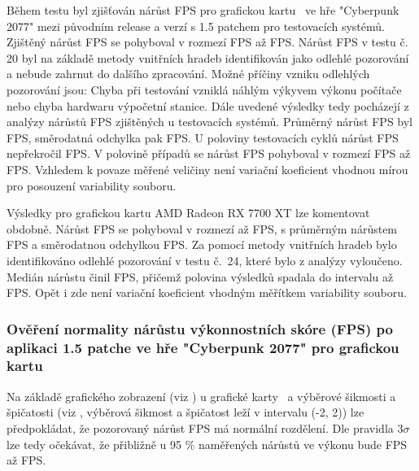 Během testu byl zjišťován nárůst FPS pro grafickou kartu \nvidiaCardTri\ ve hře "Cyberpunk 2077" mezi původním release a verzí s 1.5 patchem
pro  testovacích systémů. Zjištěný nárůst FPS se pohyboval v rozmezí  FPS
až  FPS. Nárůst FPS v testu č. 20 byl na základě metody vnitřních hradeb identifikován jako odlehlé pozorování
a nebude zahrnut do dalšího zpracování. Možné příčiny vzniku odlehlých pozorování jsou: Chyba při testování vzniklá náhlým výkyvem výkonu počítače
nebo chyba hardwaru výpočetní stanice. Dále uvedené výsledky tedy pocházejí z analýzy nárůstů FPS zjištěných u 
testovacích systémů. Průměrný nárůst FPS byl  FPS, směrodatná odchylka pak  FPS\@.
U poloviny testovacích cyklů nárůst FPS nepřekročil  FPS. V polovině případů se nárůst FPS pohyboval v
rozmezí  FPS až  FPS. Vzhledem k povaze měřené veličiny není variační koeficient vhodnou mírou
pro posouzení variability souboru.

\vspace{1em}
\noindent
Výsledky pro grafickou kartu AMD Radeon RX 7700 XT lze komentovat obdobně.
Nárůst FPS se pohyboval v rozmezí  až  FPS, s průměrným nárůstem  FPS a
směrodatnou odchylkou  FPS.\@
Za pomocí metody vnitřních hradeb bylo identifikováno odlehlé pozorování v testu č.\ 24, které bylo z analýzy vyloučeno.
Medián nárůstu činil  FPS, přičemž polovina výsledků spadala do intervalu  až  FPS.\@
Opět i zde není variační koeficient vhodným měřítkem variability souboru.

\subsubsection*{Ověření normality nárůstu výkonnostních skóre (FPS) po aplikaci 1.5 patche ve hře "Cyberpunk 2077" pro grafickou kartu \nvidiaCardTri}

Na základě grafického zobrazení (viz ) u grafické karty \nvidiaCardTri\ a výběrové šikmosti a špičatosti (viz ,
výběrová šikmost a špičatost leží v intervalu (-2, 2)) lze předpokládat, že pozorovaný nárůst FPS má normální rozdělení. Dle pravidla 3$\sigma$ lze tedy očekávat,
že přibližně u 95 \% naměřených nárůstů ve výkonu bude  FPS až  FPS\@.

